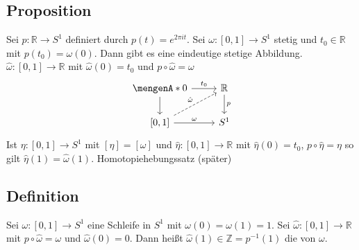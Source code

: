 \subsection[Proposition: Hebung eines Weges auf $S^1$ nach $\mathds{R}$]{Proposition} %
\label{sub:102}
Sei $p  : \mathds{R} \to S^1$ definiert durch $p(t) = e^{2 \pi i t}$. Sei $\omega : [0,1] \to S^1$ stetig und $t_0 \in \mathds{R}$ mit $p(t_0) = \omega(0)$.
Dann gibt es eine eindeutige stetige Abbildung. $\hat{\omega} : [0,1] \to \mathds{R}$ mit $\hat{\omega}(0) = t_0$ und $p  \circ  \hat{\omega} = \omega$
\[
	\begin{tikzcd}
		\set{0} \rar{t_0} \dar& \mathds{R} \dar{p} \\
		{[0,1]} \rar{\omega} \urar[dashed]{\hat{\omega}}& S^1 
	\end{tikzcd}
\]
Ist $\eta : [0,1] \to S^1$ mit $[\eta] = [\omega]$ und $\hat{\eta} : [0,1] \to \mathds{R}$ mit $\hat{\eta}(0)= t_0$, $p \circ \hat{\eta} = \eta$ so gilt 
$\hat{\eta}(1) = \hat{\omega}(1)$.
Homotopiehebungssatz (später) \bewende

\subsection[Definition: Windungszahl]{Definition} %
\label{sub:103}
Sei $\omega : [0,1] \to S^1$ eine Schleife in $S^1$ mit $\omega(0) = \omega(1) = 1$. Sei $\hat{\omega} : [0,1] \to \mathds{R}$ mit $p \circ  \hat{\omega} = \omega$ und
$\hat{\omega}(0)=0$. Dann heißt $\hat{\omega}(1) \in \mathds{Z} = p^{-1}(1)$ die  von $\omega$. 

